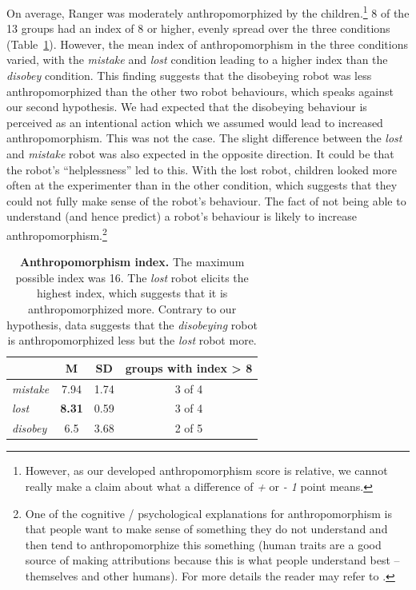 \documentclass{sig-alternate}
\begin{document}
On average, Ranger was moderately anthropomorphized by the
children.\footnote{However, as our developed anthropomorphism score is relative,
we cannot really make a claim about what a difference of \textit{+} or \textit{-
1} point means.} 8 of the 13 groups had an index of 8 or higher, evenly spread
over the three conditions (Table~\ref{tab:domino-anth-score}). However, the mean
index of anthropomorphism in the three conditions varied, with the
\textit{mistake} and \textit{lost} condition leading to a higher index than the
\textit{disobey} condition. This finding suggests that the disobeying robot was
less anthropomorphized than the other two robot behaviours, which speaks against
our second hypothesis. We had expected that the disobeying behaviour is
perceived as an intentional action which we assumed would lead to increased
anthropomorphism. This was not the case. The slight difference between the
\textit{lost} and \textit{mistake} robot was also expected in the opposite
direction. It could be that the robot's ``helplessness'' led to this. With the
lost robot, children looked more often at the experimenter than in the other
condition, which suggests that they could not fully make sense of the robot's
behaviour. The fact of not being able to understand (and hence predict) a
robot's behaviour is likely to increase anthropomorphism.\footnote{One of the
cognitive / psychological explanations for anthropomorphism is that people
want to make sense of something they do not understand and then tend to
anthropomorphize this something (human traits are a good source of making
attributions because this is what people understand best -- themselves and
other humans). For more details the reader may refer to
\cite{epley_seeing_2007}.}

\begin{table}[ht!]
    \centering
    \footnotesize
    \begin{tabular}{lccc}
        \toprule
        & M & SD & groups with index > 8 \\
        \midrule

        \textit{mistake} & 7.94 & 1.74 & 3 of 4 \\ 
        \textit{lost} & \textbf{8.31} & 0.59 & 3 of 4 \\ 
        \textit{disobey} & 6.5 & 3.68 & 2 of 5 \\
        \bottomrule
    \end{tabular}
    \caption{\textbf{Anthropomorphism index.} The maximum possible index was 16. The
    \textit{lost} robot elicits the highest index, which suggests that it is
    anthropomorphized more. Contrary to our hypothesis, data suggests that the
    \textit{disobeying} robot is anthropomorphized less but the \textit{lost} robot
    more.}

    \label{tab:domino-anth-score}       %
\end{table}	
\end{document}
